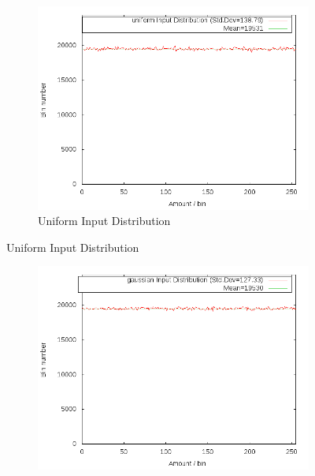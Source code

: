 \documentclass[11pt]{report} %
\begin{document}
\\
\newpage
\begin{multicols}{2}
\begin{minipage}{\columnwidth}
\begin{figure}[H]
  \centering
  \begin{subfigure}[b]{\textwidth}
    \includegraphics[width=\textwidth]{Graphs/Dist/Tabulation_uniform_dist.png}
    \caption{Uniform Input Distribution}
    \label{fig:tab_dist_uni}
  \end{subfigure}
\end{figure}
\begin{figure}[H]\ContinuedFloat
  \centering
  \begin{subfigure}[b]{\textwidth}
    \includegraphics[width=\textwidth]{Graphs/Dist/Tabulation_gaussian_dist.png}

\end{subfigure}
\end{figure}
\end{minipage}
\end{multicols}
\end{document}
